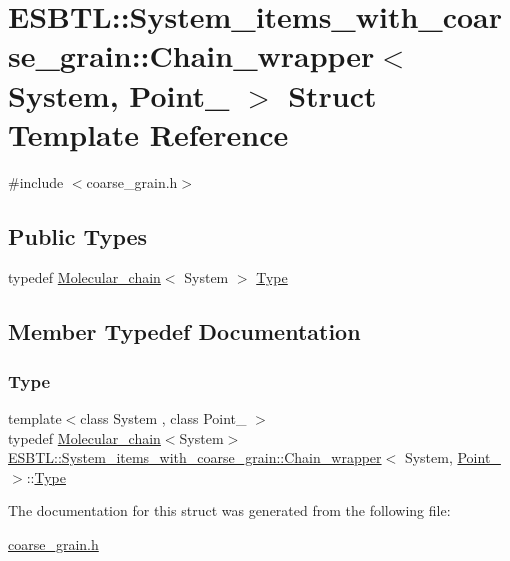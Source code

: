 \hypertarget{structESBTL_1_1System__items__with__coarse__grain_1_1Chain__wrapper}{}\section{E\+S\+B\+TL\+:\+:System\+\_\+items\+\_\+with\+\_\+coarse\+\_\+grain\+:\+:Chain\+\_\+wrapper$<$ System, Point\+\_ $>$ Struct Template Reference}
\label{structESBTL_1_1System__items__with__coarse__grain_1_1Chain__wrapper}


{\ttfamily \#include $<$coarse\+\_\+grain.\+h$>$}

\subsection*{Public Types}
\begin{DoxyCompactItemize}
\item 
typedef \hyperlink{classESBTL_1_1Molecular__chain}{Molecular\+\_\+chain}$<$ System $>$ \hyperlink{structESBTL_1_1System__items__with__coarse__grain_1_1Chain__wrapper_a5fbb0ec01f257013da71c37fb855da2d}{Type}
\end{DoxyCompactItemize}


\subsection{Member Typedef Documentation}
\mbox{\label{structESBTL_1_1System__items__with__coarse__grain_1_1Chain__wrapper_a5fbb0ec01f257013da71c37fb855da2d}} 
\subsubsection{\texorpdfstring{Type}{Type}}
{\footnotesize\ttfamily template$<$class System , class Point\+\_ $>$ \\
typedef \hyperlink{classESBTL_1_1Molecular__chain}{Molecular\+\_\+chain}$<$System$>$ \hyperlink{structESBTL_1_1System__items__with__coarse__grain_1_1Chain__wrapper}{E\+S\+B\+T\+L\+::\+System\+\_\+items\+\_\+with\+\_\+coarse\+\_\+grain\+::\+Chain\+\_\+wrapper}$<$ System, \hyperlink{classESBTL_1_1Point__3}{Point\+\_} $>$\+::\hyperlink{structESBTL_1_1System__items__with__coarse__grain_1_1Chain__wrapper_a5fbb0ec01f257013da71c37fb855da2d}{Type}}



The documentation for this struct was generated from the following file\+:\begin{DoxyCompactItemize}
\item 
\hyperlink{coarse__grain_8h}{coarse\+\_\+grain.\+h}\end{DoxyCompactItemize}
